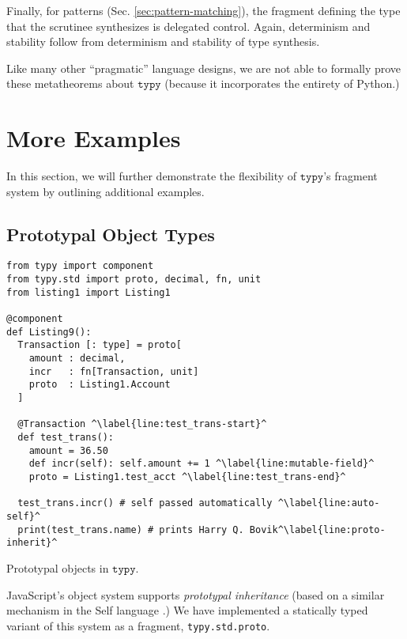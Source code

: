 \documentclass[preprint,10pt]{sigplanconf}
\newcommand{\typy}{\texttt{typy}}
\newcommand{\lip}[1]{\lstinline[language=Python,basicstyle=\ttfamily\footnotesize,deletendkeywords={tuple,buffer,map}]{#1}}
\newcommand{\li}[1]{\lip{#1}}
\begin{document}
Finally, for patterns (Sec. \ref{sec:pattern-matching}), the fragment defining the type that the scrutinee synthesizes is delegated control. Again, determinism and stability follow from determinism and stability of type synthesis.

Like many other ``pragmatic'' language designs, we are not able to formally prove these metatheorems about $\typy$ (because it incorporates the entirety of Python.) 

\section{More Examples}\label{sec:more-examples}
In this section, we will further demonstrate the flexibility of $\typy$'s fragment system by outlining additional examples.

\subsection{Prototypal Object Types}
\begin{codelisting}[t]
\vspace{-3px}
\begin{lstlisting}
from typy import component
from typy.std import proto, decimal, fn, unit
from listing1 import Listing1

@component 
def Listing9():
  Transaction [: type] = proto[
    amount : decimal,
    incr   : fn[Transaction, unit]
    proto  : Listing1.Account
  ]

  @Transaction ^\label{line:test_trans-start}^
  def test_trans():
    amount = 36.50
    def incr(self): self.amount += 1 ^\label{line:mutable-field}^
    proto = Listing1.test_acct ^\label{line:test_trans-end}^

  test_trans.incr() # self passed automatically ^\label{line:auto-self}^
  print(test_trans.name) # prints Harry Q. Bovik^\label{line:proto-inherit}^
\end{lstlisting}
\caption{Prototypal objects in $\typy$.}
\label{fig:proto-example}
\end{codelisting}

JavaScript's object system supports \emph{prototypal inheritance} (based on a similar mechanism in the Self language \cite{Ungar:Smith:oopsla:1987,Lie86}.) We have implemented a statically typed variant of this system as a fragment, \li{typy.std.proto}. 
\end{document}
